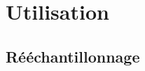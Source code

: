 \documentclass[a4paper,12pt]{article}
\begin{document}
\section{Utilisation}
\subsection{Rééchantillonnage}
\subsubsection{}
\end{document}
